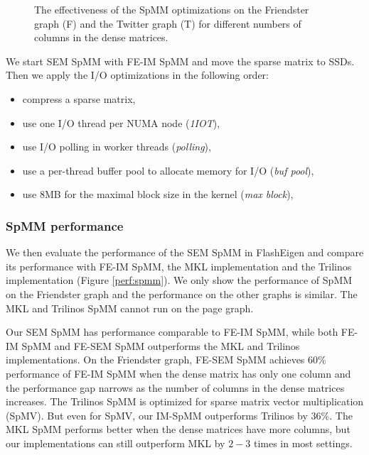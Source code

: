 \begin{figure}
	\begin{center}
		\footnotesize
		\vspace{-15pt}
		
		\vspace{-15pt}
		\caption{The effectiveness of the SpMM optimizations on the Friendster
			graph (F) and the Twitter graph (T) for different numbers of
			columns in the dense matrices.}
		\label{perf:spmm_opt}
	\end{center}
\end{figure}

We start SEM SpMM with FE-IM SpMM and move the sparse matrix to SSDs. Then we
apply the I/O optimizations in the following order:
\begin{itemize} \itemsep1pt \parskip0pt 
	\item compress a sparse matrix,
	\item use one I/O thread per NUMA node (\textit{1IOT}),
	\item use I/O polling in worker threads (\textit{polling}),
	\item use a per-thread buffer pool to allocate memory for I/O
		(\textit{buf pool}),
	\item use 8MB for the maximal block size in the kernel (\textit{max block}),
\end{itemize}

\subsubsection{SpMM performance}

We then evaluate the performance of the SEM SpMM in FlashEigen and compare its
performance with FE-IM SpMM, the MKL implementation and the Trilinos
implementation (Figure \ref{perf:spmm}). We only show the performance of
SpMM on the Friendster graph and the performance on the other graphs is
similar. The MKL and Trilinos SpMM cannot run on the page graph.

Our SEM SpMM has performance comparable to FE-IM SpMM, while both FE-IM SpMM
and FE-SEM SpMM outperforms the MKL and Trilinos implementations.
On the Friendster graph, FE-SEM SpMM achieves 60\% performance of FE-IM SpMM
when the dense matrix has only one column and the performance gap narrows
as the number of columns in the dense matrices increases.
The Trilinos SpMM is optimized for sparse matrix vector multiplication (SpMV).
But even for SpMV, our IM-SpMM outperforms Trilinos by 36\%. The MKL SpMM
performs better when the dense matrices have more columns, but our
implementations can still outperform MKL by $2-3$ times in most settings.

